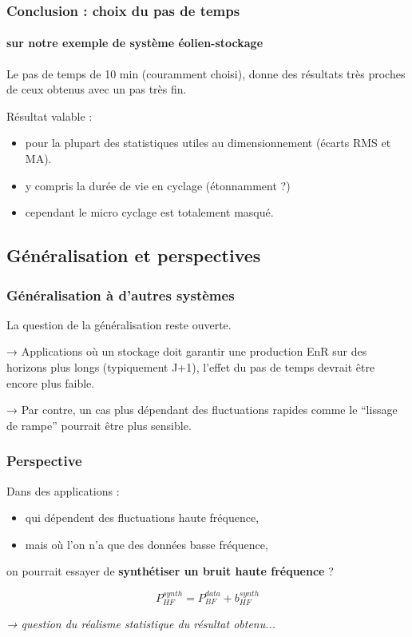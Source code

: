 \begin{frame}
  \frametitle{Conclusion : choix du pas de temps}
  \framesubtitle{sur notre exemple de système éolien-stockage}
  
  \begin{block}{}
    Le pas de temps de 10 min (couramment choisi),
    donne des résultats très proches de ceux obtenus avec un pas très fin.
  \end{block}

  \bigskip
  
  Résultat valable :
  \begin{itemize}
    \item pour la plupart des statistiques utiles au dimensionnement
    (écarts RMS et MA).
    \item y compris la durée de vie en cyclage (étonnamment ?)
    \item cependant le micro cyclage est totalement masqué.
  \end{itemize}

\end{frame}

\subsection{Généralisation et perspectives}


\begin{frame}
  \frametitle{Généralisation à d'autres systèmes}
  
  \begin{block}{}
    La question de la généralisation reste ouverte.
  \end{block}

  \bigskip
  → Applications où un stockage doit garantir une production EnR
  sur des horizons plus longs (typiquement J+1), l'effet du pas de temps devrait
  être encore plus faible.

  \bigskip
  → Par contre, un cas plus dépendant des fluctuations rapides
  comme le ``lissage de rampe'' pourrait être plus sensible.
  

\end{frame}

\begin{frame}
  \frametitle{Perspective}
  
  Dans des applications :
  
  \begin{itemize}
    \item qui dépendent des fluctuations haute fréquence,
    \item mais où l'on n'a que des données basse fréquence,
  \end{itemize}
  
  on pourrait essayer de \textbf{synthétiser un bruit haute fréquence} ?
  
  \begin{equation*}
    P_{HF}^{synth} = P_{BF}^{data} + b_{HF}^{synth}
  \end{equation*}
  
  \bigskip
  \emph{→ question du réalisme statistique du résultat obtenu...}

\end{frame}



